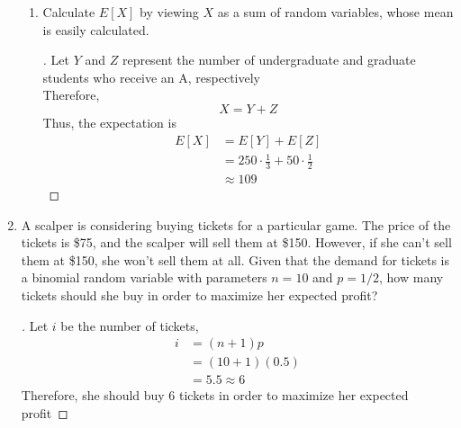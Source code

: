 \documentclass[paper=usletter, fontsize=12pt]{article}
\begin{document}
\begin{enumerate}[label=\textbf{\arabic*}.]
\begin{enumerate}[label=(\alph*)]
            \item Calculate $E[X]$ by viewing $X$ as a sum of random variables,
            whose mean is easily calculated.
            \begin{proof}[\unskip\nopunct]
                Let $Y$ and $Z$ represent the number of undergraduate and
                graduate students who receive an A, respectively\\
                Therefore,
                \begin{equation*}
                    X = Y + Z
                \end{equation*}
                Thus, the expectation is
                \begingroup
                \addtolength{\jot}{1em}
                \begin{align*}
                    E[X] &= E[Y] + E[Z] \\
                    &= 250 \cdot \frac{1}{3} + 50 \cdot \frac{1}{2} \\
                    & \approx 109
                \end{align*} \qedhere
                \endgroup
            \end{proof}
            \vspace{0.2in}

        \end{enumerate}

        \item
        A scalper is considering buying tickets for a particular game. The
        price of the tickets is \$75, and the scalper will sell them at \$150.
        However, if she can't sell them at \$150, she won't sell them at all.
        Given that the demand for tickets is a binomial random variable with
        parameters $n=10$ and $p=1/2$, how many tickets should she buy in order
        to maximize her expected profit?
        \begin{proof}[\unskip\nopunct]
            Let $i$ be the number of tickets,
            \begin{align*}
                i & = (n+1)p \\
                & = (10 + 1)(0.5) \\
                & = 5.5 \approx 6
            \end{align*}
            Therefore, she should buy 6 tickets in order to maximize her
            expected profit \qedhere
        \end{proof}
        \vspace{0.2in}


\end{enumerate}
\end{document}
